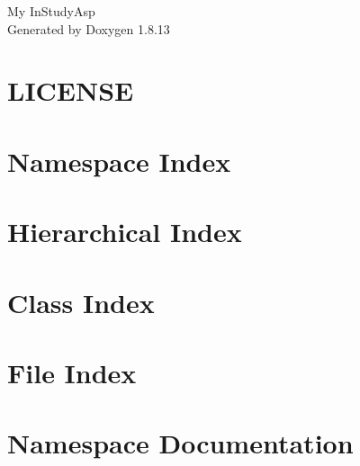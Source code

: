 \documentclass[twoside]{book}
\newcommand{\+}{\discretionary{\mbox{\scriptsize$\hookleftarrow$}}{}{}}
\newcommand{\clearemptydoublepage}{%
  \newpage{\pagestyle{empty}\cleardoublepage}%
}
\begin{document}
\hypersetup{pageanchor=false,
             bookmarksnumbered=true,
             pdfencoding=unicode
            }
\begin{titlepage}
\vspace*{7cm}
\begin{center}%
{\Large My In\+Study\+Asp }\\
\vspace*{1cm}
{\large Generated by Doxygen 1.8.13}\\
\end{center}
\end{titlepage}
\clearemptydoublepage
{}
\tableofcontents
\clearemptydoublepage
{}
\hypersetup{pageanchor=true}

\chapter{L\+I\+C\+E\+N\+SE}
\label{md__d_1___w_o_r_k___s_t_e_p__in_study_asp_packages__newtonsoft_8_json_810_80_83__l_i_c_e_n_s_e}

\chapter{Namespace Index}

\chapter{Hierarchical Index}

\chapter{Class Index}

\chapter{File Index}

\chapter{Namespace Documentation}













\end{document}

